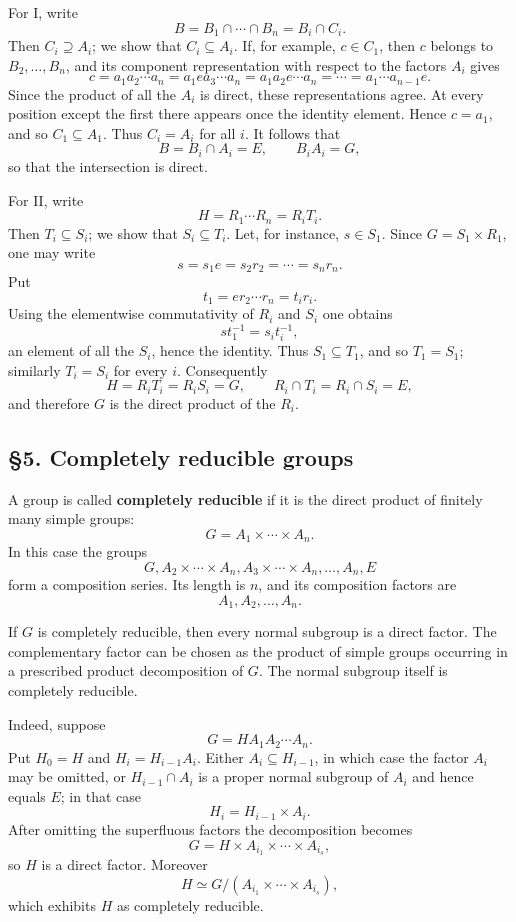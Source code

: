 \documentclass[11pt]{article}
\begin{document}
For I, write \[
  B=B_1\cap\cdots\cap B_n=B_i\cap C_i.
\] Then \(C_i\supseteq A_i\); we show that \(C_i\subseteq A_i\). If, for
example, \(c\in C_1\), then \(c\) belongs to \(B_2,\ldots,B_n\), and its
component representation with respect to the factors \(A_i\) gives \[
  c=a_1a_2\cdots a_n
   =a_1ea_3\cdots a_n
   =a_1a_2e\cdots a_n
   =\cdots=a_1\cdots a_{n-1}e.
\] Since the product of all the \(A_i\) is direct, these representations
agree. At every position except the first there appears once the
identity element. Hence \(c=a_1\), and so \(C_1\subseteq A_1\). Thus
\(C_i=A_i\) for all \(i\). It follows that \[
  B=B_i\cap A_i=E,
  \qquad B_iA_i=G,
\] so that the intersection is direct.

For II, write \[
  H=R_1\cdots R_n=R_iT_i.
\] Then \(T_i\subseteq S_i\); we show that \(S_i\subseteq T_i\). Let,
for instance, \(s\in S_1\). Since \(G=S_1\times R_1\), one may write \[
  s=s_1e=s_2r_2=\cdots=s_nr_n.
\] Put \[
  t_1=er_2\cdots r_n=t_ir_i.
\] Using the elementwise commutativity of \(R_i\) and \(S_i\) one
obtains \[
  s t_1^{-1}=s_it_i^{-1},
\] an element of all the \(S_i\), hence the identity. Thus
\(S_1\subseteq T_1\), and so \(T_1=S_1\); similarly \(T_i=S_i\) for
every \(i\). Consequently \[
  H=R_iT_i=R_iS_i=G,
  \qquad R_i\cap T_i=R_i\cap S_i=E,
\] and therefore \(G\) is the direct product of the \(R_i\).

\subsection{§5. Completely reducible
groups}\label{completely-reducible-groups}

A group is called \textbf{completely reducible} if it is the direct
product of finitely many simple groups: \[
  G=A_1\times\cdots\times A_n.
\] In this case the groups \[
  G,
  A_2\times\cdots\times A_n,
  A_3\times\cdots\times A_n,
  \ldots,
  A_n,
  E
\] form a composition series. Its length is \(n\), and its composition
factors are \[
  A_1,A_2,\ldots,A_n.
\]

If \(G\) is completely reducible, then every normal subgroup is a direct
factor. The complementary factor can be chosen as the product of simple
groups occurring in a prescribed product decomposition of \(G\). The
normal subgroup itself is completely reducible.

Indeed, suppose \[
  G=H A_1A_2\cdots A_n.
\] Put \(H_0=H\) and \(H_i=H_{i-1}A_i\). Either
\(A_i\subseteq H_{i-1}\), in which case the factor \(A_i\) may be
omitted, or \(H_{i-1}\cap A_i\) is a proper normal subgroup of \(A_i\)
and hence equals \(E\); in that case \[
  H_i=H_{i-1}\times A_i.
\] After omitting the superfluous factors the decomposition becomes \[
  G=H\times A_{i_1}\times\cdots\times A_{i_s},
\] so \(H\) is a direct factor. Moreover \[
  H\simeq G/(A_{i_1}\times\cdots\times A_{i_s}),
\] which exhibits \(H\) as completely reducible.
\end{document}
